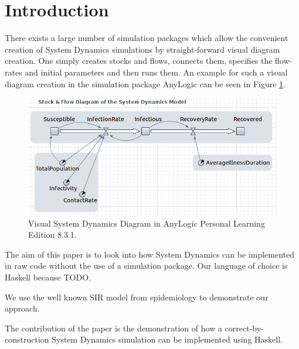 \section{Introduction}
There exists a large number of simulation packages which allow the convenient creation of System Dynamics simulations by straight-forward visual diagram creation. One simply creates stocks and flows, connects them, specifies the flow-rates and initial parameters and then runs them. An example for such a visual diagram creation in the simulation package AnyLogic can be seen in Figure \ref{fig:sir_stockflow_diagram}.

\begin{figure}
	\centering
	\includegraphics[width=.4\textwidth, angle=0]{./fig/SIR_SD_STOCKFLOW_DIAGRAMM.png}
	\caption{Visual System Dynamics Diagram in AnyLogic Personal Learning Edition 8.3.1.}
	\label{fig:sir_stockflow_diagram}
\end{figure}

The aim of this paper is to look into how System Dynamics can be implemented in raw code without the use of a simulation package. Our language of choice is Haskell because TODO.

We use the well known SIR model \cite{kermack_contribution_1927} from epidemiology to demonstrate our approach.

The contribution of the paper is the demonstration of how a correct-by-construction System Dynamics simulation can be implemented using Haskell.